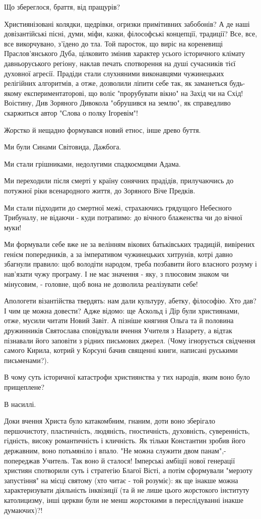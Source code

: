 Що збереглося, браття, від пращурів?

Християнізовані колядки, щедрівки, огризки примітивних забобонів? А де наші
довізантійські пісні, думи, міфи, казки, філософські концепції, традиції? Все,
все, все викорчувано, з'їдено до тла. Той паросток, що виріс на кореневищі
Праслов'янського Дуба, цілковито змінив характер усього історичного клімату
давньоруського регіону, наклав печать спотворення на душі сучасників тієї
духовної агресії. Прадіди стали слухняними виконавцями чужинецьких релігійних
алгоритмів, а отже, дозволили ліпити себе так, як заманеться будь-якому
експериментаторові, що воліє "прорубувати вікно" на Захід чи на Схід! Воістину,
Див Зоряного Дивокола "обрушився на землю", як справедливо скаржиться автор
"Слова о полку Ігоревім"!

Жорстко й нещадно формувався новий етнос, інше древо буття.

Ми були Синами Світовида, Дажбога.

Ми стали грішниками, недолугими спадкоємцями Адама.

Ми переходили після смерті у країну сонячних прадідів, прилучаючись до потужної
ріки всенародного життя, до Зоряного Віче Предків.

Ми стали підходити до смертної межі, страхаючись грядущого Небесного Трибуналу,
не відаючи - куди потрапимо: до вічного блаженства чи до вічної муки!

Ми формували себе вже не за велінням вікових батьківських традицій, вивірених
генієм попередників, а за імперативом чужинецьких хитрунів, котрі давно
збагнули правило: щоб володіти народом, треба позбавити його власного розуму і
нав'язати чужу програму. І не має значення - яку, з плюсовим знаком чи
мінусовим, - головне, щоб вона не дозволила реалізувати себе!

Апологети візантійства твердять: нам дали культуру, абетку, філософію. Хто дав?
І чим це можна довести? Адже відомо: ще Аскольд і Дір були християнами, отже,
мусили читати Новий Завіт. А пізніше княгиня Ольга та й половина дружинників
Святослава сповідували вчення Учителя з Назарету, а відтак пізнавали його
заповіти з рідних письмових джерел. (Чому ігнорується свідчення самого Кирила,
котрий у Корсуні бачив священні книги, написані руськими письменами?).

В чому суть історичної катастрофи християнства у тих народів, яким воно було
прищеплене?

В насиллі.

Доки вчення Христа було катакомбним, гнаним, доти воно зберігало першочистоту,
пластичність, людяність, гностичність, духовність, суверенність, гідність,
високу романтичність і кличність. Як тільки Константин зробив його державним,
воно потьмяніло і впало. "Не можна служити двом панам",- попереджав Учитель.
Так воно й сталося! Імперські амбіції нової генерації християн спотворили суть
і стратегію Благої Вісті, а потім сформували "мерзоту запустіння" на місці
святому (хто читає - той розуміє): як ще інакше можна характеризувати
діяльність інквізиції (та й не лише цього жорстокого інституту католицизму,
інші церкви були не менш жорстокими в переслідуванні інакше думаючих)?!

